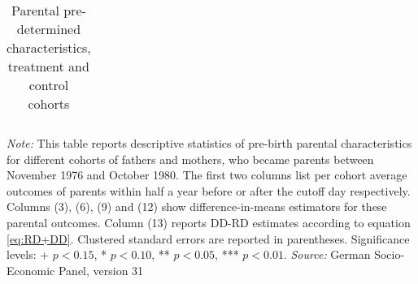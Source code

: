 \begin{landscape}
\begin{table}[p]
\begin{adjustwidth}{-2.5cm}{}
{\begin{tabular}{l*{16}{c}}
\bottomrule
\end{tabular}
}
\caption{Parental pre-determined characteristics, treatment and control cohorts}\label{tab:parental_covariate_balance}
\begin{minipage}{1.75\textwidth} %
{\footnotesize \textit{Note:} This table reports descriptive statistics of pre-birth parental characteristics for different cohorts of fathers and mothers, who became parents between November 1976 and October 1980. The first two columns list per cohort average outcomes of parents within half a year before or after the cutoff day respectively. Columns (3), (6), (9) and (12) show difference-in-means estimators for these parental outcomes. Column (13) reports DD-RD estimates according to equation \ref{eq:RD+DD}. 
Clustered standard errors are reported in parentheses. Significance levels: + \(p<0.15\), * \(p<0.10\), ** \(p<0.05\), *** \(p<0.01\). \newline \textit{Source: }German Socio-Economic Panel, version 31\par}
\end{minipage}
\end{adjustwidth}
\end{table}

\end{landscape}